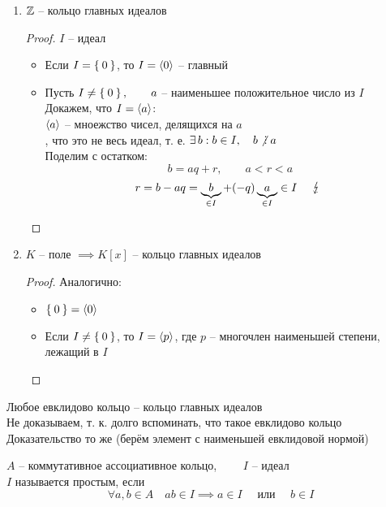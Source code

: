 \begin{theorem}
	\hfill
	\begin{enumerate}
		\item $ \mathbb{Z} $ -- кольцо главных идеалов
		\begin{proof}
			$ I $ -- идеал
			\begin{itemize}
				\item Если $ I = \Set{0} $, то $ I = \Braket{0} $ -- главный
				\item Пусть $ I \ne \Set{0}, \qquad a $ -- наименьшее положительное число из $ I $ \\
				Докажем, что $ I = \Braket{a} $: \\
				$ \Braket{a} $ -- мноежство чисел, делящихся на $ a $ \\
				, что это не весь идеал, т. е. $ \exist b : b \in I, \quad b \ndivby a $ \\
				Поделим с остатком:
				$$ b = aq + r, \qquad a < r < a $$
				$$ r = b - aq = \underbrace{b}_{\in I} + (-q)\underbrace{a}_{\in I} \in I \quad \contra $$
			\end{itemize}
		\end{proof}
		\item $ K $ -- поле $ \implies K[x] $ -- кольцо главных идеалов
		\begin{proof}
			Аналогично:
			\begin{itemize}
				\item $ \Set{0} = \Braket{0} $
				\item Если $ I \ne \Set{0} $, то $ I = \Braket{p} $, где $ p $ -- многочлен наименьшей степени, лежащий в $ I $
			\end{itemize}
		\end{proof}
	\end{enumerate}
\end{theorem}

\begin{remark}
	Любое евклидово кольцо -- кольцо главных идеалов \\
	Не доказываем, т. к. долго вспоминать, что такое евклидово кольцо \\
	Доказательство то же (берём элемент с наименьшей евклидовой нормой)
\end{remark}

\begin{definition}
	$ A $ -- коммутативное ассоциативное кольцо, $ \qquad I $ -- идеал \\
	$ I $ называется простым, если
	$$ \forall a, b \in A \quad ab \in I \implies a \in I \quad \text{ или } \quad b \in I $$
\end{definition}

